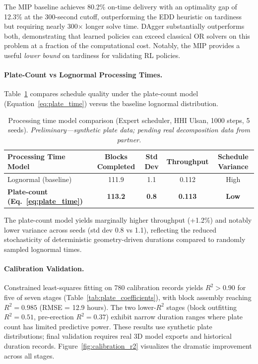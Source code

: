 \documentclass[11pt,a4paper]{article}
\begin{document}
The MIP baseline achieves 80.2\% on-time delivery with an optimality gap of 12.3\% at the 300-second cutoff, outperforming the EDD heuristic on tardiness but requiring nearly 300$\times$ longer solve time. DAgger substantially outperforms both, demonstrating that learned policies can exceed classical OR solvers on this problem at a fraction of the computational cost. Notably, the MIP provides a useful \textit{lower bound} on tardiness for validating RL policies.

\paragraph{Plate-Count vs Lognormal Processing Times.}
Table~\ref{tab:processing_time_comparison} compares schedule quality under the plate-count model (Equation~\ref{eq:plate_time}) versus the baseline lognormal distribution.

\begin{table}[h]
\centering
\caption{Processing time model comparison (Expert scheduler, HHI Ulsan, 1000 steps, 5 seeds). \textit{Preliminary---synthetic plate data; pending real decomposition data from partner.}}
\label{tab:processing_time_comparison}
\begin{tabular}{lcccc}
\toprule
Processing Time Model & Blocks Completed & Std Dev & Throughput & Schedule Variance \\
\midrule
Lognormal (baseline) & 111.9 & 1.1 & 0.112 & High \\
\textbf{Plate-count (Eq.~\ref{eq:plate_time})} & \textbf{113.2} & \textbf{0.8} & \textbf{0.113} & \textbf{Low} \\
\bottomrule
\end{tabular}
\end{table}

The plate-count model yields marginally higher throughput (+1.2\%) and notably lower variance across seeds (std dev 0.8 vs 1.1), reflecting the reduced stochasticity of deterministic geometry-driven durations compared to randomly sampled lognormal times.

\paragraph{Calibration Validation.}
Constrained least-squares fitting on 780 calibration records yields $R^2 > 0.90$ for five of seven stages (Table~\ref{tab:plate_coefficients}), with block assembly reaching $R^2 = 0.985$ (RMSE = 12.9 hours). The two lower-$R^2$ stages (block outfitting $R^2 = 0.51$, pre-erection $R^2 = 0.37$) exhibit narrow duration ranges where plate count has limited predictive power. These results use synthetic plate distributions; final validation requires real 3D model exports and historical duration records. Figure~\ref{fig:calibration_r2} visualizes the dramatic improvement across all stages.
\end{document}
